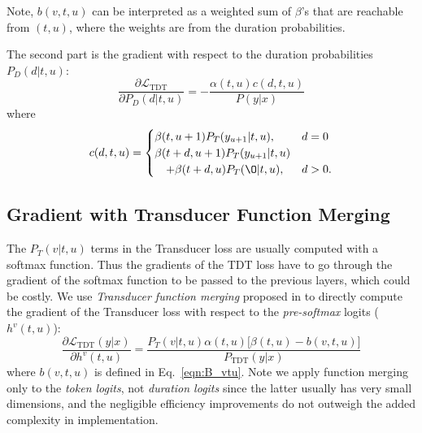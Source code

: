 \documentclass{article}
\begin{document}
Note, $b(v,t,u) $ can be interpreted as a weighted sum of  $\beta$'s that are reachable from $(t, u)$, where the weights are from the duration probabilities.

The second part is the  gradient with respect to the duration probabilities $P_D(d | t, u)$:
\begin{equation}
    \label{duration}
    \frac{\partial \mathcal{L}_\text{TDT}} {\partial P_D(d|t,u)} = -\frac{\alpha(t, u) c(d, t, u)}{P(y|x)}
\end{equation}
where
\begin{equation} \label{eqn:C_vtu}
    c(d, t, u) = \begin{cases}
        \beta(t, u + 1) P_T(y_{u+1} | t, u), & d = 0 \\
        \beta(t + d, u + 1) P_T(y_{u+1} | t, u)  \\
       \ \ \ + \beta(t + d, u) P_T(\O | t, u), & d > 0. \\
    \end{cases}
\end{equation}

\subsection{Gradient  with Transducer  Function Merging}
The $P_T(v|t, u)$ terms in the Transducer loss are usually computed with a softmax function. Thus the gradients of the TDT loss have to go through the gradient of the softmax function to be passed to the previous layers, which could be costly.
We use \emph{Transducer function merging}  proposed in \cite{li2019improving} to directly compute the gradient of the Transducer loss with respect to the \emph{pre-softmax} logits ($h^v(t,u)$):
\begin{equation} \label{rnnt_grad1}
\frac{\partial \mathcal{L}_\text{TDT}(y|x)}{\partial h^v(t,u)} = \frac{P_T(v|t, u)\alpha(t,u) \Big[\beta(t, u) - b(v, t, u)\Big] }{P_\text{TDT}(y | x)} 
\end{equation}
where $b(v,t,u) $ is defined in Eq.~\ref{eqn:B_vtu}.
Note we apply function merging only to the \emph{token logits}, not \emph{duration logits} since the latter  usually has very small dimensions, and the negligible efficiency improvements do not outweigh the added complexity in implementation.
\end{document}
